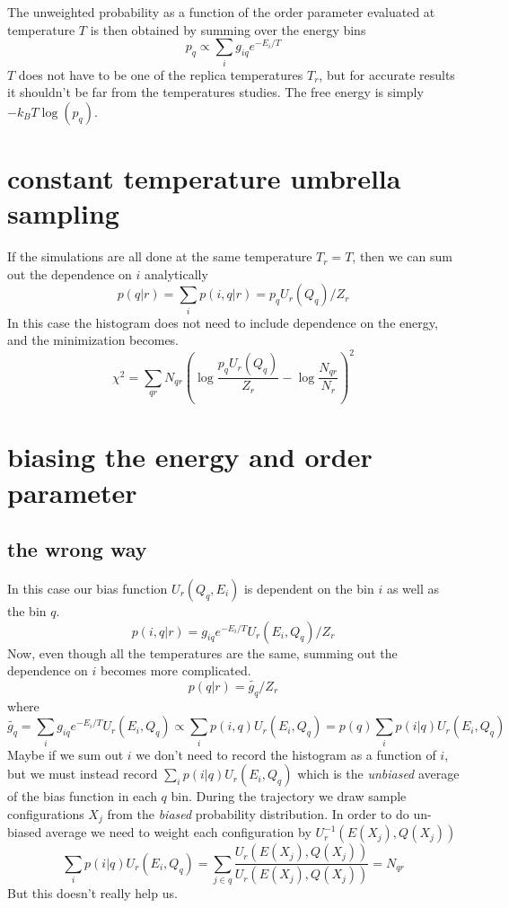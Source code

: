 \documentclass[a4paper]{article}
\begin{document}
The unweighted probability as a function of the order parameter evaluated at temperature $T$ is then obtained by summing over the energy bins
\begin{equation}
p_q \propto \sum_i g_{iq} e^{- E_i/T}
\end{equation}
$T$ does not have to be one of the replica temperatures $T_r$, but for accurate results it shouldn't be far from the temperatures studies. 
The free energy is simply $- k_B T \log(p_q)$.  

\section{constant temperature umbrella sampling}

If the simulations are all done at the same temperature $T_r = T$, then we can sum out the dependence on $i$
analytically
\begin{equation}
p(q|r) = \sum_i p(i,q|r) = p_q U_r(Q_q) / Z_{r}
\end{equation}
In this case the histogram does not need to include dependence on the energy, and the minimization becomes.
\begin{equation}
\chi^2 = \sum_{qr} N_{qr} \left( \log \frac{p_{q} U_r(Q_q) }{Z_r} - \log \frac{N_{qr}}{N_r} \right)^2
\end{equation}

\section{biasing the energy and order parameter}

\subsection{the wrong way}

In this case our bias function $U_r(Q_q, E_i)$ is dependent on the bin $i$ as well as the bin $q$.
\begin{equation}
p(i,q|r) = g_{iq} e^{-E_i / T} U_r(E_i, Q_q) / Z_{r}
\end{equation}
Now, even though all the temperatures are the same, summing out the 
dependence on $i$ becomes more complicated.
\begin{equation}
p(q|r) = \tilde{g_{q}} / Z_{r}
\end{equation}
where
\begin{equation}
\tilde{g_q} = \sum_i g_{iq} e^{-E_i / T} U_r(E_i, Q_q) \propto \sum_i p(i,q) U_r(E_i, Q_q) = p(q) \sum_i p(i|q) U_r(E_i, Q_q)
\end{equation}
Maybe if we sum out $i$ we don't need to record the histogram as a function of $i$, but we must
instead record $\sum_i p(i|q) U_r(E_i, Q_q)$ which is the \emph{unbiased} average of the bias function in each $q$ bin.
During the trajectory we draw sample configurations $X_j$ from the \emph{biased} probability distribution.
In order to do un-biased average we need to weight each configuration by $U_r^{-1}(E(X_j), Q(X_j))$
\begin{equation}
\sum_i p(i|q) U_r(E_i, Q_q) = \sum_{j\in q} \frac{U_r(E(X_j), Q(X_j))}{U_r(E(X_j), Q(X_j))} = N_{qr}
\end{equation}
But this doesn't really help us.
\end{document}
